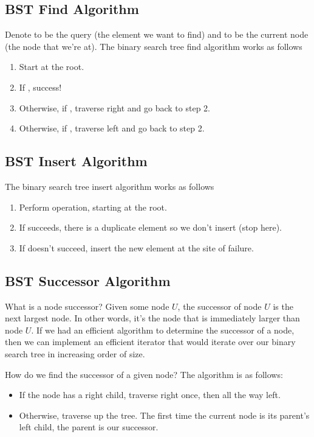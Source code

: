 \documentclass[letterpaper]{article}
\begin{document}
\subsection{BST Find Algorithm}
Denote  to be the query (the element we want to find) and  to be the current node (the node that we're at). The binary search tree find algorithm works as follows
\begin{enumerate}
    \item Start at the root. 
    \item If , success! 
    \item Otherwise, if , traverse right and go back to step 2. 
    \item Otherwise, if , traverse left and go back to step 2. 
\end{enumerate}

\subsection{BST Insert Algorithm}
The binary search tree insert algorithm works as follows
\begin{enumerate}
    \item Perform  operation, starting at the root. 
    \item If  succeeds, there is a duplicate element so we don't insert (stop here). 
    \item If  doesn't succeed, insert the new element at the site of failure. 
\end{enumerate}

\subsection{BST Successor Algorithm}
What is a node successor? Given some node $U$, the successor of node $U$ is the next largest node. In other words, it's the node that is immediately larger than node $U$. If we had an efficient algorithm to determine the successor of a node, then we can implement an efficient iterator that would iterate over our binary search tree in increasing order of size.

\bigskip 

How do we find the successor of a given node? The algorithm is as follows: 
\begin{itemize}
    \item If the node has a right child, traverse right once, then all the way left. 
    \item Otherwise, traverse up the tree. The first time the current node is its parent's left child, the parent is our successor. 
\end{itemize}
\end{document}
